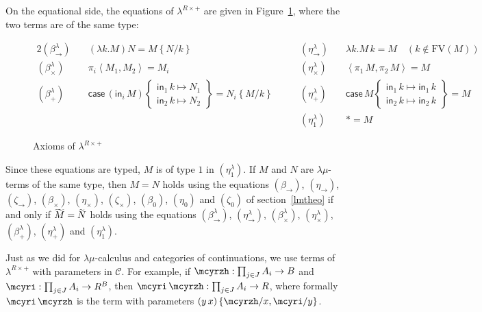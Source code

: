 \documentclass{CSML}
\newcommand*\FV[1]{\text{FV}\left(#1\right)}
\newcommand*\LogSubst[1]{\left\{#1\right\}}
\newcommand*\LmSortBot0
\newcommand*\LmSortTimes\times
\newcommand*\LmSortTo\to
\newcommand*\LmTermA{M}
\newcommand*\LmTermB{N}
\newcommand*\LmVarA{x}
\newcommand*\LmVarB{y}
\newcommand*\LmPair[2]{\left\langle#1,#2\right\rangle}
\newcommand*\LmProj{\pi}
\newcommand*\Lam{\lambda^{R\times+}}
\newcommand*\LamTypeTo\to
\newcommand*\LamTypeTimes\times
\newcommand*\LamTypePlus{+}
\newcommand*\LamTypeUnit{1}
\newcommand*\LamTermA{M}
\newcommand*\LamTermB{N}
\newcommand*\LamVarA{k}
\newcommand*\LamSubst[1]{\left\{#1\right\}}
\newcommand*\LamCPS[1]{\raisebox{0pt}[.9\height]{$\widetilde{\raisebox{0pt}[.9\height]{$#1$}}$}}
\newcommand*\LamIn{\mathsf{in}}
\newcommand*\LamCaseBlock[4]{\mathsf{case}\,#1\left\{\begin{gathered}\LamIn_1\,#2\mapsto#3\\\LamIn_2\,#2\mapsto#4\end{gathered}\right\}}
\newcommand*\LamUnit{*}
\newcommand*\CatC{\mathcal{C}}
\newcommand*\CatObjA{A}
\newcommand*\CatObjB{B}
\newcommand*\CatR{R}
\newcommand*\CatExp[2]{#1^{#2}}
\newcommand*\CatCHomA\mcyrzh
\newcommand*\CatCHomB\mcyri
\begin{document}
On the equational side, the equations of $\Lam$ are given in Figure~\ref{LamAxioms}, where the two terms are of the same type:
\begin{figure}
\begin{alignat*}{2}
\left(\beta_\LamTypeTo^\lambda\right)\quad&\left(\lambda\LamVarA.\LamTermA\right)\LamTermB=\LamTermA\LamSubst{\LamTermB/\LamVarA}
\qquad&
\left(\eta_\LamTypeTo^\lambda\right)\quad&\lambda\LamVarA.\LamTermA\,\LamVarA=\LamTermA\quad\left(\LamVarA\notin\FV{\LamTermA}\right)
\\
\left(\beta_\LamTypeTimes^\lambda\right)\quad&\LmProj_i\LmPair{\LamTermA_1}{\LamTermA_2}=\LamTermA_i
\qquad&
\left(\eta_\LamTypeTimes^\lambda\right)\quad&\LmPair{\LmProj_1\,\LamTermA}{\LmProj_2\,\LamTermA}=\LamTermA
\\
\left(\beta_\LamTypePlus^\lambda\right)\quad&\LamCaseBlock{\left(\LamIn_i\,\LamTermA\right)}{\LamVarA}{\LamTermB_1}{\LamTermB_2}=\LamTermB_i\LamSubst{\LamTermA/\LamVarA}
\qquad&
\left(\eta_\LamTypePlus^\lambda\right)\quad&\LamCaseBlock{\LamTermA}{\LamVarA}{\LamIn_1\,\LamVarA}{\LamIn_2\,\LamVarA}=\LamTermA
\\
\quad&
\qquad&
\left(\eta_\LamTypeUnit^\lambda\right)\quad&\LamUnit=\LamTermA
\end{alignat*}
\caption{Axioms of $\Lam$}
\label{LamAxioms}
\end{figure}
Since these equations are typed, $\LmTermA$ is of type $\LamTypeUnit$ in $\left(\eta_1^\lambda\right)$. If $\LmTermA$ and $\LmTermB$ are $\lambda\mu$-terms of the same type, then $\LmTermA=\LmTermB$ holds using the equations $\left(\beta_\LmSortTo\right)$, $\left(\eta_\LmSortTo\right)$, $\left(\zeta_\LmSortTo\right)$, $\left(\beta_\LmSortTimes\right)$, $\left(\eta_\LmSortTimes\right)$, $\left(\zeta_\LmSortTimes\right)$, $\left(\beta_\LmSortBot\right)$, $\left(\eta_\LmSortBot\right)$ and $\left(\zeta_\LmSortBot\right)$ of section~\ref{lmtheo} if and only if $\LamCPS{\LmTermA}=\LamCPS{\LmTermB}$ holds using the equations $\left(\beta_\LamTypeTo^\lambda\right)$, $\left(\eta_\LamTypeTo^\lambda\right)$, $\left(\beta_\LamTypeTimes^\lambda\right)$, $\left(\eta_\LamTypeTimes^\lambda\right)$, $\left(\beta_\LamTypePlus^\lambda\right)$, $\left(\eta_\LamTypePlus^\lambda\right)$ and $\left(\eta_\LamTypeUnit^\lambda\right)$.\par
Just as we did for $\lambda\mu$-calculus and categories of continuations, we use terms of $\Lam$ with parameters in $\CatC$. For example, if $\CatCHomA:\prod_{j\in J}\CatObjA_i\to\CatObjB$ and $\CatCHomB:\prod_{j\in J}\CatObjA_i\to\CatExp{\CatR}{\CatObjB}$, then $\CatCHomB\,\CatCHomA:\prod_{j\in J}\CatObjA_i\to\CatR$, where formally $\CatCHomB\,\CatCHomA$ is the term with parameters $\left(\LmVarB\,\LmVarA\right)\LogSubst{\CatCHomA/\LmVarA,\CatCHomB/\LmVarB}$.\par
\end{document}
